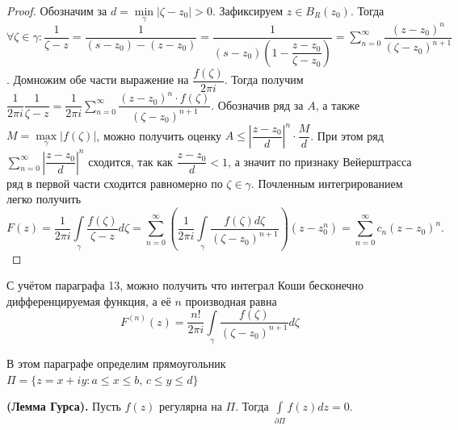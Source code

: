 \begin{proof}
    Обозначим за \(d = \min\limits_\gamma |\zeta - z_0| > 0\). Зафиксируем \(z \in B_R(z_0)\). Тогда
    \(\forall \zeta \in \gamma \colon \dfrac{1}{\zeta - z} = \dfrac{1}{(s-z_0) - (z-z_0)} = 
    \dfrac{1}{(s-z_0)(1- \dfrac{z-z_0}{\zeta-z_0})} = \sum\limits_{n=0}^\infty \dfrac{(z-z_0)^n}
    {(\zeta - z_0)^{n+1}}\). Домножим обе части выражение на \(\dfrac{f(\zeta)}{2\pi i}\). Тогда
    получим \(\dfrac{1}{2\pi i} \dfrac{1}{\zeta - z} = \dfrac{1}{2 \pi i}
    \sum\limits_{n=0}^\infty \dfrac{(z-z_0)^n \cdot f(\zeta)}{(\zeta - z_0)^{n+1}}\). Обозначив ряд
    за \(A\), а также \(M = \max\limits_\gamma |f(\zeta)|\), можно получить оценку \(A \le 
    \left|\dfrac{z-z_0}{d}\right|^n \cdot \dfrac{M}{d}\). При этом ряд \(\sum\limits_{n=0}^\infty
    \left|\dfrac{z-z_0}{d}\right|^n\) сходится, так как \(\dfrac{z-z_0}{d} < 1\), а значит по 
    признаку Вейерштрасса ряд в первой части сходится равномерно по \(\zeta \in \gamma\). Почленным
    интегрированием легко получить 
    \[F(z) = \dfrac{1}{2\pi i} \int\limits_\gamma \dfrac{f(\zeta)}{\zeta - z}d\zeta = 
    \sum\limits_{n=0}^\infty (\dfrac{1}{2 \pi i} \int\limits_\gamma \dfrac{f(\zeta) d\zeta}
    {(\zeta - z_0)^{n+1}})(z-z_0^n) = \sum\limits_{n=0}^\infty c_n (z-z_0)^n.\]
\end{proof}

\begin{corollary}\label{14:inf_dif_int_koshi}
    С учётом параграфа 13, можно получить что интеграл Коши бесконечно дифференцируемая функция,
    а её \(n\) производная равна 
    \[F^{(n)}(z) = \dfrac{n!}{2 \pi i} \int\limits_\gamma \dfrac{f(\zeta)}{(\zeta - z_0)^{n+1}}
    d \zeta\]
\end{corollary}



В этом параграфе определим прямоугольник \(\Pi = \{z = x+iy \colon a \le x \le b, \, c \le y \le 
d\}\)

\begin{statement}\label{15:gurs}
    \textbf{(Лемма Гурса).} Пусть \(f(z)\) регулярна на \(\Pi\). Тогда \(\int\limits_{\partial \Pi}
    f(z) dz = 0\).
\end{statement}


